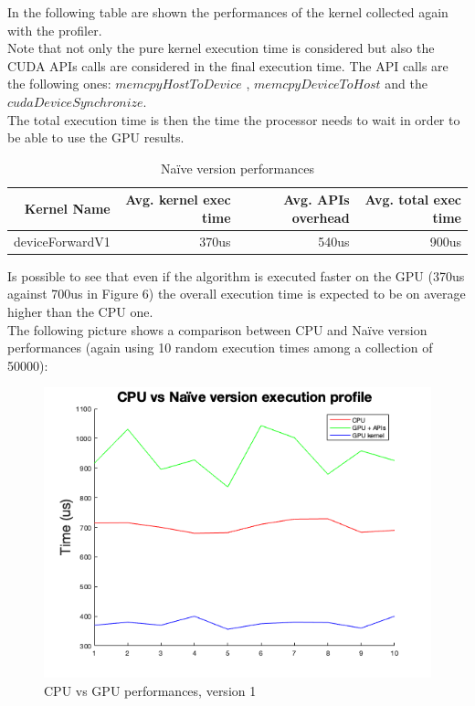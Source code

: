 \documentclass[a4paper]{report}
\begin{document}
In the following table are shown the performances of the kernel collected again with the profiler.\\
Note that not only the pure kernel execution time is considered but also the CUDA APIs calls are considered in the final execution time.
The API calls are the following ones: \( memcpy HostToDevice \) ,  \( memcpyDeviceToHost \) and the \( cudaDeviceSynchronize \).\\
The total execution time is then the time the processor needs to wait in order to be able to use the GPU results.

\begin{table}[!h]
\centering
\begin{tabular}{|r|r|r|r|}
\hline
\textbf{Kernel Name} & \textbf{Avg. kernel exec time} & \textbf{Avg. APIs overhead} & \textbf{Avg. total exec time} \\ \hline
deviceForwardV1           & 370us          & 540us   & 900us\\ \hline
\end{tabular}
\vspace*{3mm}
\caption{Naïve version performances}
\label{table:t2}
\end{table}

Is possible to see that even if the algorithm is executed faster on the GPU (370us against 700us in Figure 6) the overall execution time is expected to be on average higher than the CPU one.\\
The following picture shows a comparison between CPU and Naïve version performances (again using 10 random execution times among a collection of 50000):

\begin{figure}[!h]
\centering
\includegraphics[scale=0.5]{docs/cpuVSnaive.png} 
\caption{CPU vs GPU performances, version 1}
\label{fig_gpu1}
\end{figure}
\end{document}

